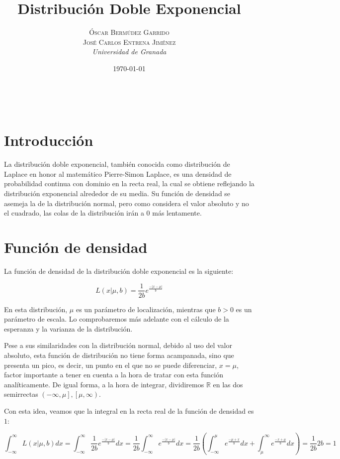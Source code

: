 \documentclass[a4paper, 10pt]{article} %
\title{\textbf{Distribución Doble Exponencial}\\ %
\vspace{20 pt}
} %
\author{\textsc{Óscar Bermúdez Garrido\\José Carlos Entrena Jiménez} %
\\{\textit{Universidad de Granada}}} %
\date{\today} %
\makeatletter
\renewcommand{\maketitle}{ %
\begin{center} %
{\Huge\@title} %
\end{center}

\vspace{20pt} %

\begin{flushright} %
{\large\@author} %
\\\@date %

\vspace{40pt} %
\end{flushright}
\renewcommand{\baselinestretch}{0.5}

}
\makeatother
\begin{document}
\maketitle
\tableofcontents
\pagebreak

\section{Introducción}

La distribución doble exponencial, también conocida como distribución de Laplace en honor al matemático
Pierre-Simon Laplace, es una densidad de probabilidad continua con dominio en la recta real, la cual se obtiene
reflejando la distribución exponencial alrededor de su media. Su función de densidad se asemeja la de la
distribución normal, pero como considera el valor absoluto y no el cuadrado, las colas de la distribución
irán a $0$ más lentamente. 

\section{Función de densidad}

La función de densidad de la distribución doble exponencial es la siguiente: 

$$L(x|\mu, b)=\frac{1}{2b}e^\frac{-|x-\mu|}{b}$$

En esta distribución, $\mu$ es un parámetro de localización, mientras que $b > 0$ es un parámetro de escala. Lo comprobaremos más adelante con el cálculo de la esperanza y la varianza de la distribución. 

Pese a sus similaridades con la distribución normal, debido al uso del valor absoluto, esta función de
distribución no tiene forma acampanada, sino que presenta un pico, es decir, un punto en el que no se puede
diferenciar, $x = \mu$, factor importante a tener en cuenta a la hora de tratar con esta función analíticamente.
De igual forma, a la hora de integrar, dividiremos $\mathbb{R}$ en las dos semirrectas $\left(-\infty, \mu\right],
\left[\mu, \infty\right)$.

Con esta idea, veamos que la integral en la recta real de la función de densidad es $1$: 

$$\int_{-\infty}^{\infty} L(x|\mu, b)dx = \int_{-\infty}^{\infty} \frac{1}{2b}e^\frac{-|x-\mu|}{b}dx =
\frac{1}{2b}\int_{-\infty}^{\infty}e^\frac{-|x-\mu|}{b}dx = 
\frac{1}{2b}\left( \int_{-\infty}^{\mu}e^\frac{-\mu+x}{b}dx + \int_{\mu}^{\infty}e^\frac{-x+\mu}{b}dx \right) =
\frac{1}{2b}2b = 1$$
 
\end{document}
